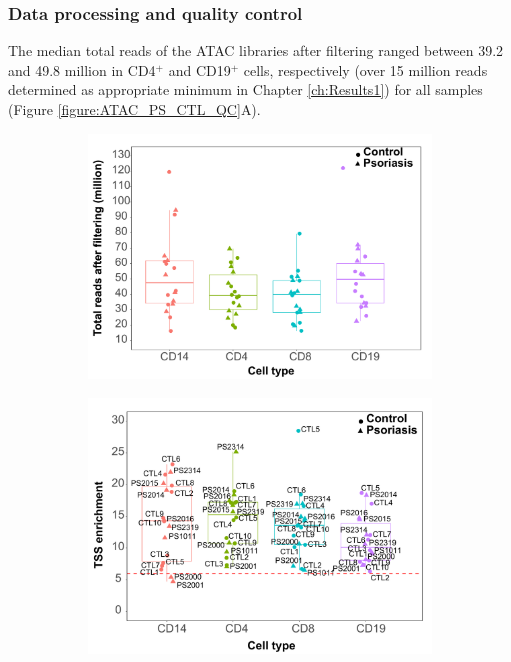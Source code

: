 \subsubsection{Data processing and quality control}
The median total reads of the ATAC libraries after filtering ranged between 39.2 and 49.8 million in CD4$^+$ and CD19$^+$ cells, respectively (over 15 million reads determined as appropriate minimum in Chapter \ref{ch:Results1}) for all samples (Figure \ref{figure:ATAC_PS_CTL_QC}A). 


\begin{figure}[htbp]
\centering
\begin{subfigure}{0.5\textwidth}
\centering
\includegraphics[width=\textwidth]{./Results2/pdfs/ATAC_PS_CTL_final_filtered_reads_boxplot}
\caption{\textbf{}}
\end{subfigure}%
\begin{subfigure}{0.5\textwidth}
\centering
\includegraphics[width=\textwidth]{./Results2/pdfs/ATAC_PS_CTL_all_samples_TSS_boxplots_all_labelled}

\end{subfigure}
\end{figure}
